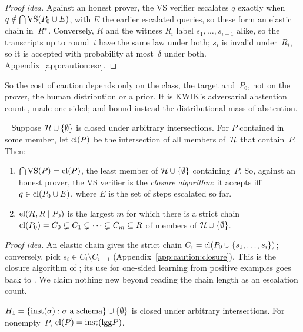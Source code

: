 \begin{proof}[Proof idea]
Against an honest prover, the VS verifier escalates $q$ exactly when $q\notin\bigcap\mathrm{VS}(P_0\cup E)$, with $E$ the earlier escalated queries, so these form an elastic chain in~$R^{*}$. Conversely, $R$ and the witness $R_i$ label $s_1,\dots,s_{i-1}$ alike, so the transcripts up to round~$i$ have the same law under both; $s_i$ is invalid under~$R_i$, so it is accepted with probability at most~$\delta$ under both. Appendix~\ref{app:caution:esc}.
\end{proof}

So the cost of caution depends only on the class, the target and~$P_0$, not on the prover, the human distribution or a prior. It is KWIK's adversarial abstention count \citep{li2008knows,li2011knows}, made one-sided; \citet{rivest1988learning} and \citet{elyaniv2010foundations} bound instead the distributional mass of abstention.

\begin{proposition}\ \label{prop:caution:closure}
Suppose $\mathcal{H}\cup\{\emptyset\}$ is closed under arbitrary intersections. For $P$ contained in some member, let $\mathrm{cl}(P)$ be the intersection of all members of~$\mathcal{H}$ that contain~$P$. Then:
\begin{enumerate}[label=(\roman*)]
\item $\bigcap\mathrm{VS}(P)=\mathrm{cl}(P)$, the least member of $\mathcal{H}\cup\{\emptyset\}$ containing~$P$. So, against an honest prover, the VS verifier is the \emph{closure algorithm}: it accepts iff $q\in\mathrm{cl}(P_0\cup E)$, where $E$ is the set of steps escalated so far.
\item $\mathrm{el}(\mathcal{H},R\mid P_0)$ is the largest $m$ for which there is a strict chain $\mathrm{cl}(P_0)=C_0\subsetneq C_1\subsetneq\dots\subsetneq C_m\subseteq R$ of members of $\mathcal{H}\cup\{\emptyset\}$.
\end{enumerate}
\end{proposition}

\noindent\emph{Proof idea.} An elastic chain gives the strict chain $C_i=\mathrm{cl}(P_0\cup\{s_1,\dots,s_i\})$; conversely, pick $s_i\in C_i\setminus C_{i-1}$ (Appendix~\ref{app:caution:closure}). This is the closure algorithm of \citet{helmbold1990learning}; its use for one-sided learning from positive examples goes back to \citet{natarajan1987learning}. We claim nothing new beyond reading the chain length as an escalation count.

\begin{lemma}\label{lem:caution:h1}
$H_1=\{\mathrm{inst}(\sigma):\sigma\text{ a schema}\}\cup\{\emptyset\}$ is closed under arbitrary intersections. For nonempty~$P$, $\mathrm{cl}(P)=\mathrm{inst}(\mathrm{lgg} P)$.
\end{lemma}

